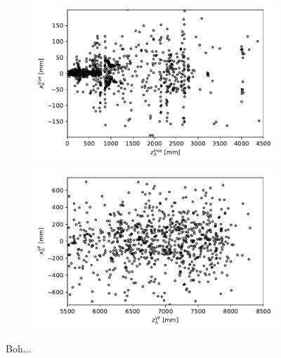 \begin{figure}[t]
	\centering
	\begin{subfigure}{.45\textwidth}
		\includegraphics[width=\textwidth]{graphics/04-event_selection/bump_Lambda_true_endvertex_z_vs_x.pdf}
		\caption{}
	\end{subfigure}
	\begin{subfigure}{.45\textwidth}
		\includegraphics[width=\textwidth]{graphics/04-event_selection/bump_scatter_Lambda_endvertex_z_vs_x.pdf}
		\caption{}
	\end{subfigure}
	\caption[A and b.]{Boh...}
\end{figure}


